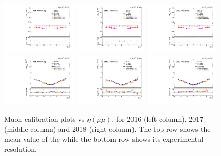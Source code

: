 \begin{figure}[!htb]
      \centering
      \captionsetup{justification=justified}
      \includegraphics[width=0.32\textwidth]{pics/muon_corr/muon_cal/2016/dimu_eta_summary_mean.pdf}
      \includegraphics[width=0.32\textwidth]{pics/muon_corr/muon_cal/2017/dimu_eta_summary_mean.pdf}
      \includegraphics[width=0.32\textwidth]{pics/muon_corr/muon_cal/2018/dimu_eta_summary_mean.pdf}
      \includegraphics[width=0.32\textwidth]{pics/muon_corr/muon_cal/2016/dimu_eta_summary_reso.pdf}
      \includegraphics[width=0.32\textwidth]{pics/muon_corr/muon_cal/2017/dimu_eta_summary_reso.pdf}
      \includegraphics[width=0.32\textwidth]{pics/muon_corr/muon_cal/2018/dimu_eta_summary_reso.pdf}
      \caption{Muon calibration plots vs $\eta(\mu\mu)$, for 2016 (left column), 2017 (middle column) and 2018 (right column).
               The top row shows the mean value of the \mmm while the bottom row shows its experimental resolution.}
      \label{fig:mucal_dimu_pt}
\end{figure}


